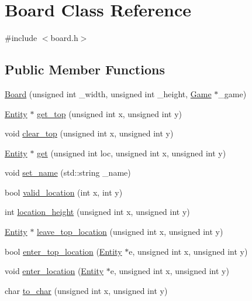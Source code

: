 \hypertarget{class_board}{\section{Board Class Reference}
\label{class_board}
}


{\ttfamily \#include $<$board.\-h$>$}

\subsection*{Public Member Functions}
\begin{DoxyCompactItemize}
\item 
\hyperlink{class_board_a533223f28724623e763587dc401baefa}{Board} (unsigned int \-\_\-width, unsigned int \-\_\-height, \hyperlink{class_game}{Game} $\ast$\-\_\-game)
\item 
\hyperlink{class_entity}{Entity} $\ast$ \hyperlink{class_board_ae58237ab49518bbfec3260152e02335c}{get\-\_\-top} (unsigned int x, unsigned int y)
\item 
void \hyperlink{class_board_a91b01e0fb35aa30fb60252867fedb1e7}{clear\-\_\-top} (unsigned int x, unsigned int y)
\item 
\hyperlink{class_entity}{Entity} $\ast$ \hyperlink{class_board_adad073b1a8011cba63eb8c945da9ba28}{get} (unsigned int loc, unsigned int x, unsigned int y)
\item 
void \hyperlink{class_board_a458cae7e6bb9189f7bf0b3ab1036ea6f}{set\-\_\-name} (std\-::string \-\_\-name)
\item 
bool \hyperlink{class_board_a4ea85ce0aad0d905e3757a3531396178}{valid\-\_\-location} (int x, int y)
\item 
int \hyperlink{class_board_a8ee871cbc57f75299eb95652ab1c3411}{location\-\_\-height} (unsigned int x, unsigned int y)
\item 
\hyperlink{class_entity}{Entity} $\ast$ \hyperlink{class_board_ad77efbd5de132a72a97a9307b111f622}{leave\-\_\-top\-\_\-location} (unsigned int x, unsigned int y)
\item 
bool \hyperlink{class_board_a34efaf5d1af34d910525b20a00d8ff34}{enter\-\_\-top\-\_\-location} (\hyperlink{class_entity}{Entity} $\ast$e, unsigned int x, unsigned int y)
\item 
void \hyperlink{class_board_ae4b3c84812939e557a58e92468a2234b}{enter\-\_\-location} (\hyperlink{class_entity}{Entity} $\ast$e, unsigned int x, unsigned int y)
\item 
char \hyperlink{class_board_ac0253eac886de98047fc70833c4832e0}{to\-\_\-char} (unsigned int x, unsigned int y)

\end{DoxyCompactItemize}
